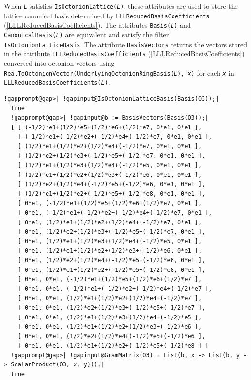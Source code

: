 \documentclass[a4paper,11pt]{report}
\begin{document}
{{{ When \mbox{\texttt{\mdseries\slshape L}} satisfies \texttt{IsOctonionLattice(\mbox{\texttt{\mdseries\slshape L}})}, these attributes are used to store the lattice canonical basis determined by \texttt{LLLReducedBasisCoefficients} (\ref{LLLReducedBasisCoefficients}). The attributes \texttt{Basis(\mbox{\texttt{\mdseries\slshape L}})} and \texttt{CanonicalBasis(\mbox{\texttt{\mdseries\slshape L}})} are equivalent and satisfy the filter \texttt{IsOctonionLatticeBasis}. The attribute \texttt{BasisVectors} returns the vectors stored in the attribute \texttt{LLLReducedBasisCoefficients} (\ref{LLLReducedBasisCoefficients}) converted into octonion vectors using \texttt{RealToOctonionVector(UnderlyingOctonionRingBasis(\mbox{\texttt{\mdseries\slshape L}}), \mbox{\texttt{\mdseries\slshape x}})} for each \mbox{\texttt{\mdseries\slshape x}} in \texttt{LLLReducedBasisCoefficients(\mbox{\texttt{\mdseries\slshape L}})}. 
\begin{Verbatim}[commandchars=!@|,fontsize=\small,frame=single,label=Example]
  !gapprompt@gap>| !gapinput@IsOctonionLatticeBasis(Basis(O3));|
  true
  !gapprompt@gap>| !gapinput@b := BasisVectors(Basis(O3));|
  [ [ (-1/2)*e1+(1/2)*e5+(1/2)*e6+(1/2)*e7, 0*e1, 0*e1 ],
    [ (-1/2)*e1+(-1/2)*e2+(-1/2)*e4+(-1/2)*e7, 0*e1, 0*e1 ],
    [ (1/2)*e1+(1/2)*e2+(1/2)*e4+(-1/2)*e7, 0*e1, 0*e1 ],
    [ (1/2)*e2+(1/2)*e3+(-1/2)*e5+(-1/2)*e7, 0*e1, 0*e1 ],
    [ (1/2)*e1+(1/2)*e3+(1/2)*e4+(-1/2)*e5, 0*e1, 0*e1 ],
    [ (1/2)*e1+(1/2)*e2+(1/2)*e3+(-1/2)*e6, 0*e1, 0*e1 ],
    [ (1/2)*e2+(1/2)*e4+(-1/2)*e5+(-1/2)*e6, 0*e1, 0*e1 ],
    [ (1/2)*e1+(1/2)*e2+(-1/2)*e5+(-1/2)*e8, 0*e1, 0*e1 ],
    [ 0*e1, (-1/2)*e1+(1/2)*e5+(1/2)*e6+(1/2)*e7, 0*e1 ],
    [ 0*e1, (-1/2)*e1+(-1/2)*e2+(-1/2)*e4+(-1/2)*e7, 0*e1 ],
    [ 0*e1, (1/2)*e1+(1/2)*e2+(1/2)*e4+(-1/2)*e7, 0*e1 ],
    [ 0*e1, (1/2)*e2+(1/2)*e3+(-1/2)*e5+(-1/2)*e7, 0*e1 ],
    [ 0*e1, (1/2)*e1+(1/2)*e3+(1/2)*e4+(-1/2)*e5, 0*e1 ],
    [ 0*e1, (1/2)*e1+(1/2)*e2+(1/2)*e3+(-1/2)*e6, 0*e1 ],
    [ 0*e1, (1/2)*e2+(1/2)*e4+(-1/2)*e5+(-1/2)*e6, 0*e1 ],
    [ 0*e1, (1/2)*e1+(1/2)*e2+(-1/2)*e5+(-1/2)*e8, 0*e1 ],
    [ 0*e1, 0*e1, (-1/2)*e1+(1/2)*e5+(1/2)*e6+(1/2)*e7 ],
    [ 0*e1, 0*e1, (-1/2)*e1+(-1/2)*e2+(-1/2)*e4+(-1/2)*e7 ],
    [ 0*e1, 0*e1, (1/2)*e1+(1/2)*e2+(1/2)*e4+(-1/2)*e7 ],
    [ 0*e1, 0*e1, (1/2)*e2+(1/2)*e3+(-1/2)*e5+(-1/2)*e7 ],
    [ 0*e1, 0*e1, (1/2)*e1+(1/2)*e3+(1/2)*e4+(-1/2)*e5 ],
    [ 0*e1, 0*e1, (1/2)*e1+(1/2)*e2+(1/2)*e3+(-1/2)*e6 ],
    [ 0*e1, 0*e1, (1/2)*e2+(1/2)*e4+(-1/2)*e5+(-1/2)*e6 ],
    [ 0*e1, 0*e1, (1/2)*e1+(1/2)*e2+(-1/2)*e5+(-1/2)*e8 ] ]
  !gapprompt@gap>| !gapinput@GramMatrix(O3) = List(b, x -> List(b, y -> ScalarProduct(O3, x, y)));|
  true
\end{Verbatim}
 }

}}
\end{document}
